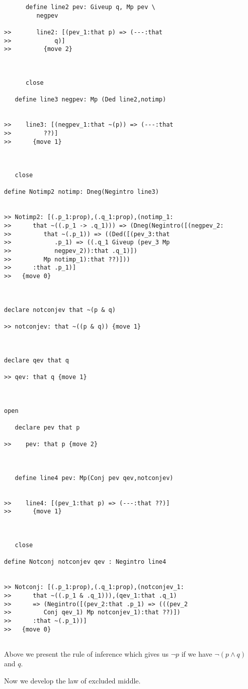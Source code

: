 \documentclass[12pt]{article}
\begin{document}
\begin{verbatim}
      define line2 pev: Giveup q, Mp pev \
         negpev

>>       line2: [(pev_1:that p) => (---:that
>>            q)]
>>         {move 2}



      close

   define line3 negpev: Mp (Ded line2,notimp)


>>    line3: [(negpev_1:that ~(p)) => (---:that
>>         ??)]
>>      {move 1}



   close

define Notimp2 notimp: Dneg(Negintro line3)


>> Notimp2: [(.p_1:prop),(.q_1:prop),(notimp_1:
>>      that ~((.p_1 -> .q_1))) => (Dneg(Negintro([(negpev_2:
>>         that ~(.p_1)) => ((Ded([(pev_3:that
>>            .p_1) => ((.q_1 Giveup (pev_3 Mp
>>            negpev_2)):that .q_1)])
>>         Mp notimp_1):that ??)]))
>>      :that .p_1)]
>>   {move 0}



declare notconjev that ~(p & q)

>> notconjev: that ~((p & q)) {move 1}



declare qev that q

>> qev: that q {move 1}



open

   declare pev that p

>>    pev: that p {move 2}



   define line4 pev: Mp(Conj pev qev,notconjev)


>>    line4: [(pev_1:that p) => (---:that ??)]
>>      {move 1}



   close

define Notconj notconjev qev : Negintro line4


>> Notconj: [(.p_1:prop),(.q_1:prop),(notconjev_1:
>>      that ~((.p_1 & .q_1))),(qev_1:that .q_1)
>>      => (Negintro([(pev_2:that .p_1) => (((pev_2
>>         Conj qev_1) Mp notconjev_1):that ??)])
>>      :that ~(.p_1))]
>>   {move 0}


\end{verbatim}

Above we present the rule of inference which gives us $\neg p$ if we have $\neg(p \wedge q)$ and $q$.

Now we develop the law of excluded middle.
\end{document}
